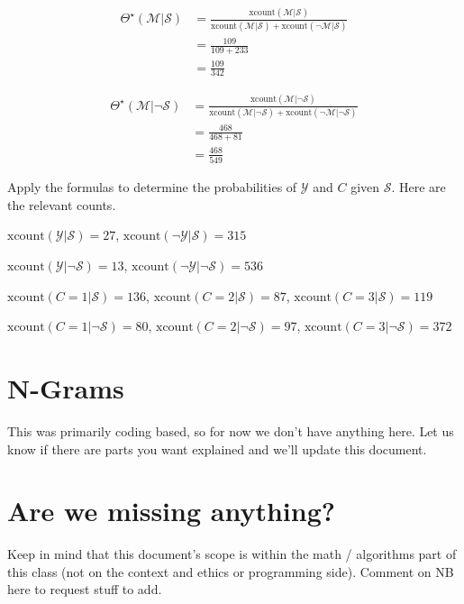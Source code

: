 \documentclass{tufte-handout}
\begin{document}
\begin{align}
\Theta^\star(\mathcal{M}|  \mathcal{S}) &= \frac{\mbox{xcount}(\mathcal{M}| \mathcal{S})}{\mbox{xcount}(\mathcal{M}| \mathcal{S}) + \mbox{xcount}(\neg \mathcal{M}|  \mathcal{S}) } \nonumber \\
&= \frac{109}{109+233} \nonumber \\
&= \frac{109}{342} \nonumber
\end{align}

\begin{align}
\Theta^\star(\mathcal{M}| \neg \mathcal{S}) &= \frac{\mbox{xcount}(\mathcal{M}| \neg \mathcal{S})}{\mbox{xcount}(\mathcal{M}| \neg \mathcal{S}) + \mbox{xcount}(\neg \mathcal{M}| \neg \mathcal{S}) } \nonumber \\
&= \frac{468}{468+81} \nonumber \\
&= \frac{468}{549} \nonumber
\end{align}

\begin{exercise}
Apply the formulas to determine the probabilities of $\mathcal{Y}$ and $C$ given $\mathcal{S}$.  Here are the relevant counts.

\bi
\item $\mbox{xcount}(\mathcal{Y}|  \mathcal{S}) = 27$,  $\mbox{xcount}(\neg \mathcal{Y}|  \mathcal{S}) = 315$
\item $\mbox{xcount}(\mathcal{Y}| \neg \mathcal{S}) = 13$,  $\mbox{xcount}(\neg \mathcal{Y}| \neg \mathcal{S}) = 536$
\item $\mbox{xcount}(C=1 | \mathcal{S}) = 136$, $\mbox{xcount}(C=2 | \mathcal{S}) = 87$, $\mbox{xcount}(C=3 | \mathcal{S}) = 119$
\item $\mbox{xcount}(C=1 | \neg \mathcal{S}) = 80$, $\mbox{xcount}(C=2 | \neg \mathcal{S}) = 97$, $\mbox{xcount}(C=3 | \neg \mathcal{S}) = 372$
\ei

\end{exercise}

\ei



\section{N-Grams}
This was primarily coding based, so for now we don't have anything here.  Let us know if there are parts you want explained and we'll update this document.

\section{Are we missing anything?}
Keep in mind that this document's scope is within the math / algorithms part of this class (not on the context and ethics or programming side).  Comment on NB here to request stuff to add. 
\end{document}
